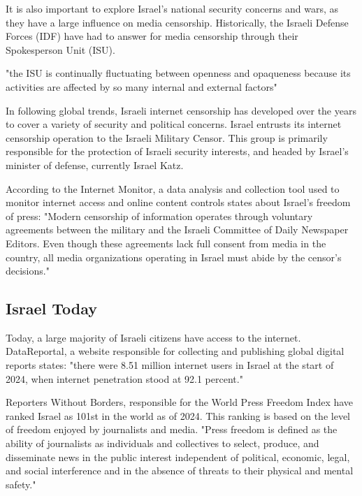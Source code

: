 It is also important to explore Israel's national security concerns and wars, as they have a large influence on media censorship. Historically, the Israeli Defense Forces (IDF) have had to answer for media censorship through their Spokesperson Unit (ISU). 

"the ISU is continually fluctuating between openness and opaqueness because its activities are affected by so many internal and external factors" \cite{MAGEN2018287}


In following global trends, Israeli internet censorship has developed over the years to cover a variety of security and political concerns. Israel entrusts its internet censorship operation to the Israeli Military Censor. This group is primarily responsible for the protection of Israeli security interests, and headed by Israel's minister of defense, currently Israel Katz.\cite{MOD_Israel} 

According to the Internet Monitor, a data analysis and collection tool used to monitor internet access and online content controls states about Israel's freedom of press: "Modern censorship of information operates through voluntary agreements between the military and the Israeli Committee of Daily Newspaper Editors. Even though these agreements lack full consent from media in the country, all media organizations operating in Israel must abide by the censor's decisions." \cite{internet_monitor_israel}



\subsection{Israel Today}
Today, a large majority of Israeli citizens have access to the internet. 
DataReportal, a website responsible for collecting and publishing global digital reports states: "there were 8.51 million internet users in Israel at the start of 2024, when internet penetration stood at 92.1 percent." \cite{Digital2024Israel}

Reporters Without Borders, responsible for the World Press Freedom Index have ranked Israel as 101st in the world as of 2024. This ranking is based on the level of freedom enjoyed by journalists and media. "Press freedom is defined as the ability of journalists as individuals and collectives to select, produce, and disseminate news in the public interest independent of political, economic, legal, and social interference and in the absence of threats to their physical and mental safety." \cite{rsf_israel}

